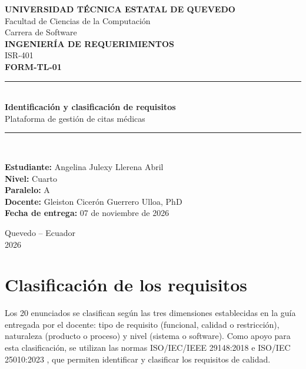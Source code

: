 \documentclass[12pt,a4paper,oneside]{article}
\newcommand{\nombreestudiante}{Angelina Julexy Llerena Abril}
\newcommand{\paralelo}{A}
\newcommand{\fechaentrega}{07 de noviembre de 2026}
\begin{document}
\begin{titlepage}
    \centering

    {\large \textbf{UNIVERSIDAD TÉCNICA ESTATAL DE QUEVEDO}}\\[0.3cm]
    {\large Facultad de Ciencias de la Computación}\\
    {\large Carrera de Software}\\[1.5cm]

    {\Large \textbf{INGENIERÍA DE REQUERIMIENTOS}}\\[0.5cm]
    {\large ISR-401}\\[1.5cm]

    {\LARGE \textbf{FORM-TL-01}}\\[0.9cm]

    \rule{0.85\textwidth}{0.5pt}\\[0.5cm]
    {\large \textbf{Identificación y clasificación de requisitos}}\\
    {\large Plataforma de gestión de citas médicas}\\[0.5cm]
    \rule{0.85\textwidth}{0.5pt}\\[2cm]

    \begin{flushleft}
        \textbf{Estudiante:} \nombreestudiante\\[0.4cm]
        \textbf{Nivel:} Cuarto\\[0.4cm]
        \textbf{Paralelo:} \paralelo\\[0.4cm]
        \textbf{Docente:} Gleiston Cicerón Guerrero Ulloa, PhD\\[0.4cm]
        \textbf{Fecha de entrega:} \fechaentrega
    \end{flushleft}

    \vfill
    {\large Quevedo -- Ecuador}\\
    {\large 2026}
\end{titlepage}

\section{Clasificación de los requisitos}

Los 20 enunciados se clasifican según las tres dimensiones establecidas en la guía entregada por el docente: tipo de requisito (funcional, calidad o restricción), naturaleza (producto o proceso) y nivel (sistema o software). Como apoyo para esta clasificación, se utilizan las normas ISO/IEC/IEEE 29148:2018 \cite{ieee29148} e ISO/IEC 25010:2023 \cite{iso25010}, que permiten identificar y clasificar los requisitos de calidad.
\end{document}
